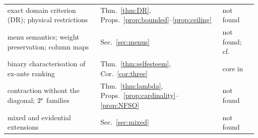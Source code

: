 \begin{table}[htbp]
\begin{tabularx}{\textwidth}{@{}>{\raggedright\arraybackslash}X
                                    >{\raggedright\arraybackslash}p{6.8em}
                                    >{\raggedright\arraybackslash}p{8.6em}@{}}
    exact domain criterion (DR); physical restrictions & Thm.~\ref{thm:DR}, Props.~\ref{prop:bounded}--\ref{prop:ceiling} & not found \\
    menu semantics; weight preservation; column maps & Sec.~\ref{sec:menus} & not found; cf.\ \textcite{gallow2026} \\
    binary characterisation of ex-ante ranking & Thm.~\ref{thm:selfesteem}, Cor.~\ref{cor:three} & core in \textcite{podgorski2022} \\
    contraction without the diagonal; $2^{\mathfrak{c}}$ families & Thm.~\ref{thm:lambda}, Props.~\ref{prop:cardinality}--\ref{prop:NFSO} & not found \\
    mixed and evidential extensions & Sec.~\ref{sec:mixed} & not found \\
    \bottomrule
  \end{tabularx}
\end{table}


